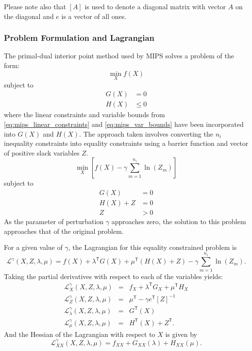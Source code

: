 \documentclass[12pt]{article}
\newcommand{\mips}[0]{{MIPS}}
\newcommand{\trans}[1]{{#1}^{\ensuremath{\mathsf{T}}}}  %
\newcommand{\diag}[1]{\left[{#1}\right]}                %
\numberwithin{equation}{section}
\numberwithin{table}{section}
\numberwithin{figure}{section}
\begin{document}
Please note also that $\diag{A}$ is used to denote a diagonal matrix with vector $A$ on the diagonal and $e$ is a vector of all ones.


\subsubsection{Problem Formulation and Lagrangian}

The primal-dual interior point method used by \mips{} solves a problem of the form:
\begin{equation}
\min_X f(X)
\end{equation}
subject to
\begin{align}
G(X) &= 0 \\
H(X) &\le 0
\end{align}
where the linear constraints and variable bounds from \eqref{eq:mips_linear_constraints} and \eqref{eq:mips_var_bounds} have been incorporated into $G(X)$ and $H(X)$. The approach taken involves converting the $n_i$ inequality constraints into equality constraints using a barrier function and vector of positive slack variables $Z$.
\begin{equation}
\min_X \left[f(X) - \gamma \sum_{m=1}^{n_i} \ln(Z_m)\right]
\end{equation}
subject to
\begin{align}
G(X) &= 0 \\
H(X) + Z &= 0 \\
Z &> 0
\end{align}
As the parameter of perturbation $\gamma$ approaches zero, the solution to this problem approaches that of the original problem.

For a given value of $\gamma$, the Lagrangian for this equality constrained problem is
\begin{equation}
\mathcal{L}^\gamma(X, Z, \lambda, \mu) = f(X) + \trans{\lambda} G(X) + \trans{\mu} (H(X) + Z) - \gamma \sum_{m=1}^{n_i} \ln(Z_m).
\label{eq:L}
\end{equation}
Taking the partial derivatives with respect to each of the variables yields:
\begin{eqnarray}
\mathcal{L}^\gamma_X(X, Z, \lambda, \mu) &=& f_X + \trans{\lambda} G_X + \trans{\mu} H_X \\
\mathcal{L}^\gamma_Z(X, Z, \lambda, \mu) &=& \trans{\mu} - \gamma \trans{e} \diag{Z}^{-1} \\
\mathcal{L}^\gamma_\lambda(X, Z, \lambda, \mu) &=& \trans{G}(X) \\
\mathcal{L}^\gamma_\mu(X, Z, \lambda, \mu) &=& \trans{H}(X) + \trans{Z}.
\end{eqnarray}
And the Hessian of the Lagrangian with respect to $X$ is given by
\begin{equation}
\mathcal{L}^\gamma_{XX}(X, Z, \lambda, \mu) = f_{XX} + G_{XX}(\lambda) + H_{XX}(\mu).
\end{equation}
\end{document}
